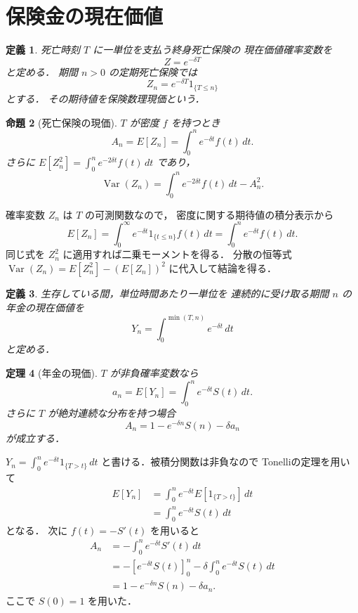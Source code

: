 \documentclass[a5paper,10pt,onecolumn]{jsarticle}
\makeatletter
\theoremstyle{mathnotetheorem}
\newtheorem{theorem}{定理}[section]
\newtheorem{definition}[theorem]{定義}
\newtheorem{proposition}[theorem]{命題}
\renewcommand{\proofname}{証明}
\renewenvironment{proof}[1][\proofname]{%
  \par\pushQED{\qed}\normalfont\topsep4\p@\@plus2\p@\relax
  \trivlist\item[\hskip\labelsep\bfseries #1]\ignorespaces
}{\popQED\endtrivlist\@endpefalse}
\makeatother
\begin{document}
\section{保険金の現在価値}

\begin{definition}
死亡時刻 $T$ に一単位を支払う終身死亡保険の
\emph{現在価値確率変数}を
\[
 Z=e^{-\delta T}
\]
と定める．
期間 $n>0$ の定期死亡保険では
\[
 Z_n=e^{-\delta T}1_{\{T\le n\}}
\]
とする．
その期待値を\emph{保険数理現価}という．
\end{definition}

\begin{proposition}[死亡保険の現価]\label{prop:insurance-apv}
$T$ が密度 $f$ を持つとき
\[
 A_n=E[Z_n]=\int_0^n e^{-\delta t}f(t)\,dt.
\]
さらに $E[Z_n^2]=\int_0^n e^{-2\delta t}f(t)\,dt$
であり，
\[
 \operatorname{Var}(Z_n)
 =\int_0^n e^{-2\delta t}f(t)\,dt-A_n^2.
\]
\end{proposition}
\begin{proof}
確率変数 $Z_n$ は $T$ の可測関数なので，
密度に関する期待値の積分表示から
\[
 E[Z_n]=\int_0^\infty
 e^{-\delta t}1_{\{t\le n\}}f(t)\,dt
 =\int_0^n e^{-\delta t}f(t)\,dt.
\]
同じ式を $Z_n^2$ に適用すれば二乗モーメントを得る．
分散の恒等式
$\operatorname{Var}(Z_n)=E[Z_n^2]-(E[Z_n])^2$
に代入して結論を得る．
\end{proof}

\begin{definition}
生存している間，単位時間あたり一単位を
連続的に受け取る期間 $n$ の年金の現在価値を
\[
 Y_n=\int_0^{\min(T,n)}e^{-\delta t}\,dt
\]
と定める．
\end{definition}

\begin{theorem}[年金の現価]\label{thm:annuity}
$T$ が非負確率変数なら
\[
 a_n=E[Y_n]=\int_0^n e^{-\delta t}S(t)\,dt.
\]
さらに $T$ が絶対連続な分布を持つ場合
\[
 A_n=1-e^{-\delta n}S(n)-\delta a_n
\]
が成立する．
\end{theorem}
\begin{proof}
$Y_n=\int_0^n e^{-\delta t}1_{\{T>t\}}\,dt$
と書ける．被積分関数は非負なので
Tonelliの定理を用いて
\begin{align*}
 E[Y_n]
 &=\int_0^n e^{-\delta t}E[1_{\{T>t\}}]\,dt\\
 &=\int_0^n e^{-\delta t}S(t)\,dt
\end{align*}
となる．
次に $f(t)=-S'(t)$ を用いると
\begin{align*}
 A_n
 &=-\int_0^n e^{-\delta t}S'(t)\,dt\\
 &=-[e^{-\delta t}S(t)]_{0}^{n}
   -\delta\int_0^n e^{-\delta t}S(t)\,dt\\
 &=1-e^{-\delta n}S(n)-\delta a_n.
\end{align*}
ここで $S(0)=1$ を用いた．
\end{proof}
\end{document}
